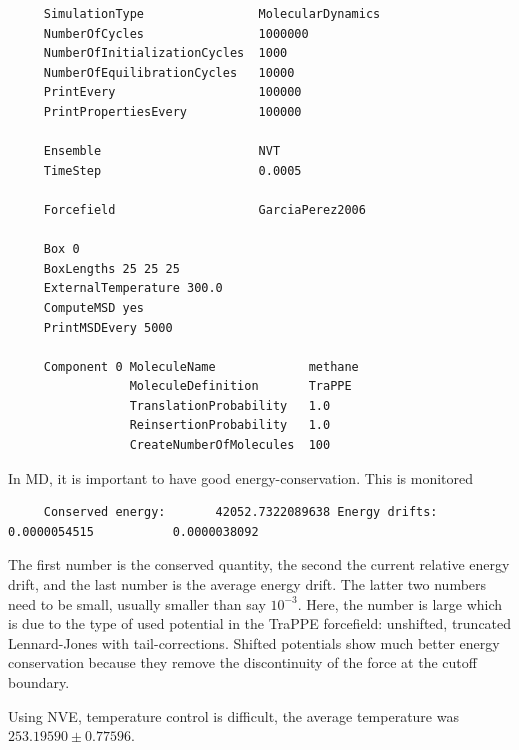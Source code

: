 \begin{tiny}
\begin{verbatim}
     SimulationType                MolecularDynamics
     NumberOfCycles                1000000
     NumberOfInitializationCycles  1000
     NumberOfEquilibrationCycles   10000
     PrintEvery                    100000
     PrintPropertiesEvery          100000
     
     Ensemble                      NVT
     TimeStep                      0.0005
     
     Forcefield                    GarciaPerez2006
     
     Box 0
     BoxLengths 25 25 25
     ExternalTemperature 300.0
     ComputeMSD yes
     PrintMSDEvery 5000
     
     Component 0 MoleculeName             methane
                 MoleculeDefinition       TraPPE
                 TranslationProbability   1.0
                 ReinsertionProbability   1.0
                 CreateNumberOfMolecules  100
\end{verbatim}
\end{tiny}

In MD, it is important to have good energy-conservation. This is monitored
\begin{tiny}
\begin{verbatim}
     Conserved energy:       42052.7322089638 Energy drifts:  0.0000054515           0.0000038092
\end{verbatim}
\end{tiny}
The first number is the conserved quantity, the second the current relative energy drift, and the last number is the average energy drift.
The latter two numbers need to be small, usually smaller than say $10^{-3}$. Here, the number is large which is due to the type of
used potential in the TraPPE forcefield: unshifted, truncated Lennard-Jones with tail-corrections. Shifted potentials show much
better energy conservation because they remove the discontinuity of the force at the cutoff boundary.

Using NVE, temperature control is difficult, the average temperature was $253.19590\pm0.77596$. 

